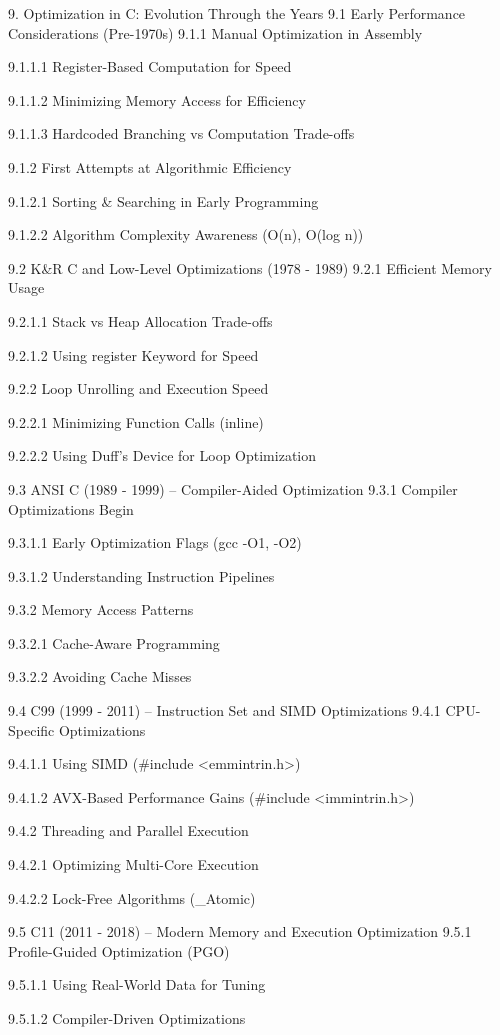 9. Optimization in C: Evolution Through the Years
9.1 Early Performance Considerations (Pre-1970s)
9.1.1 Manual Optimization in Assembly

9.1.1.1 Register-Based Computation for Speed

9.1.1.2 Minimizing Memory Access for Efficiency

9.1.1.3 Hardcoded Branching vs Computation Trade-offs

9.1.2 First Attempts at Algorithmic Efficiency

9.1.2.1 Sorting & Searching in Early Programming

9.1.2.2 Algorithm Complexity Awareness (O(n), O(log n))

9.2 K&R C and Low-Level Optimizations (1978 - 1989)
9.2.1 Efficient Memory Usage

9.2.1.1 Stack vs Heap Allocation Trade-offs

9.2.1.2 Using register Keyword for Speed

9.2.2 Loop Unrolling and Execution Speed

9.2.2.1 Minimizing Function Calls (inline)

9.2.2.2 Using Duff’s Device for Loop Optimization

9.3 ANSI C (1989 - 1999) – Compiler-Aided Optimization
9.3.1 Compiler Optimizations Begin

9.3.1.1 Early Optimization Flags (gcc -O1, -O2)

9.3.1.2 Understanding Instruction Pipelines

9.3.2 Memory Access Patterns

9.3.2.1 Cache-Aware Programming

9.3.2.2 Avoiding Cache Misses

9.4 C99 (1999 - 2011) – Instruction Set and SIMD Optimizations
9.4.1 CPU-Specific Optimizations

9.4.1.1 Using SIMD (#include <emmintrin.h>)

9.4.1.2 AVX-Based Performance Gains (#include <immintrin.h>)

9.4.2 Threading and Parallel Execution

9.4.2.1 Optimizing Multi-Core Execution

9.4.2.2 Lock-Free Algorithms (_Atomic)

9.5 C11 (2011 - 2018) – Modern Memory and Execution Optimization
9.5.1 Profile-Guided Optimization (PGO)

9.5.1.1 Using Real-World Data for Tuning

9.5.1.2 Compiler-Driven Optimizations

